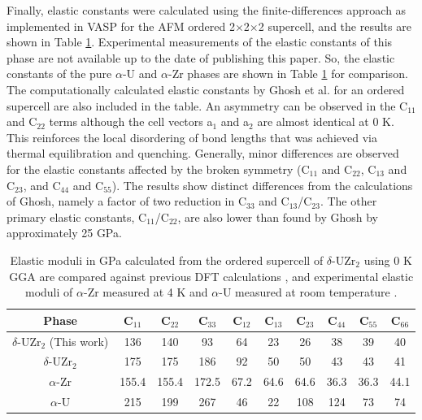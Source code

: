 \documentclass[preprint,12pt]{elsarticle}
\begin{document}
Finally, elastic constants were calculated using the finite-differences approach as implemented in VASP for the AFM ordered 2$\times$2$\times$2 supercell, and the results are shown in Table \ref{tab:elas_const}. Experimental measurements of the elastic constants of this phase are not available up to the date of publishing this paper. So, the elastic constants of the pure $\alpha$-U and $\alpha$-Zr phases are shown in Table \ref{tab:elas_const} for comparison. The computationally calculated elastic constants by Ghosh et al. \cite{ghosh_chemical_2021} for an ordered supercell are also included in the table. An asymmetry can be observed in the C$_{11}$ and C$_{22}$ terms although the cell vectors a$_{1}$ and a$_{2}$ are almost identical at 0 K. This reinforces the local disordering of bond lengths that was achieved via thermal equilibration and quenching. Generally, minor differences are observed for the elastic constants affected by the broken symmetry (C$_{11}$ and C$_{22}$, C$_{13}$ and C$_{23}$, and C$_{44}$ and C$_{55}$). The results show distinct differences from the calculations of Ghosh, namely a factor of two reduction in C$_{33}$ and C$_{13}$/C$_{23}$. The other primary elastic constants, C$_{11}$/C$_{22}$, are also lower than found by Ghosh \cite{ghosh_chemical_2021} by approximately 25 GPa. 

\begin{table}[h!]
    \centering
        \caption{Elastic moduli in GPa calculated from the ordered supercell of $\delta$-UZr$_2$ using 0 K GGA are compared against previous DFT calculations \cite{ghosh_chemical_2021}, and experimental elastic moduli of $\alpha$-Zr measured at 4 K \cite{fisher_single-crystal_1964} and $\alpha$-U measured at room temperature \cite{fisher1958adiabatic}.}
    \label{tab:elas_const}
    \begin{tabular}{|c|c|c|c|c|c|c|c|c|c|}
    \hline
Phase & C$_{11}$ & C$_{22}$ & C$_{33}$  & C$_{12}$ & C$_{13}$ & C$_{23}$ & C$_{44}$ & C$_{55}$ & C$_{66}$   \\
 \hline
   $\delta$-UZr$_2$ (This work) &136& 140 & 93 & 64 & 23 &26 & 38 & 39 & 40 \\
   \hline
     $\delta$-UZr$_2$ \cite{ghosh_chemical_2021} &175& 175 & 186 & 92 & 50 &50 & 43 & 43 & 41 \\
   \hline
   $\alpha$-Zr  \cite{fisher_single-crystal_1964} & 155.4 &155.4 &172.5 &67.2 &64.6 &64.6 &36.3 &36.3 &44.1 \\
   \hline
    $\alpha$-U \cite{fisher1958adiabatic} & 215&199 &267 &46 &22 &108 & 124& 73&74\\
     \hline
    \end{tabular}
\end{table}
\end{document}
